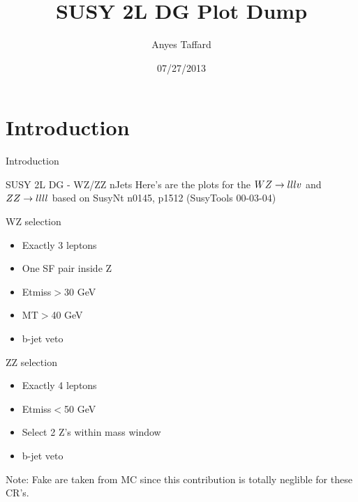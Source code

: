 \documentclass[10pt]{beamer}
\begin{document}
\author{Anyes Taffard}
\date{07/27/2013}

\title[SUSY 2L DG WZ/ZZ CR]{SUSY 2L DG Plot Dump}

\begin{frame}[plain]
  \titlepage
\end{frame}

\section{Introduction}
\begin{frame}{Introduction}
  \begin{block}{SUSY 2L DG - WZ/ZZ nJets }
    Here's are the plots for the $WZ\rightarrow lllv$ and $ZZ \rightarrow llll$ based on SusyNt n0145, p1512 (SusyTools 00-03-04)



    WZ selection
    \begin{itemize}
      \item Exactly 3 leptons 
      \item One SF pair inside Z   
      \item Etmiss$>$30 GeV
      \item MT$>$40 GeV
      \item b-jet veto  
    \end{itemize}
    ZZ selection
    \begin{itemize}    
      \item Exactly 4 leptons
      \item Etmiss$<$50 GeV
      \item Select 2 Z's within mass window  
      \item b-jet veto
    \end{itemize}

    Note: Fake are taken from MC since this contribution is totally neglible for these CR's.
  \end{block}
\end{frame}
\end{document}
